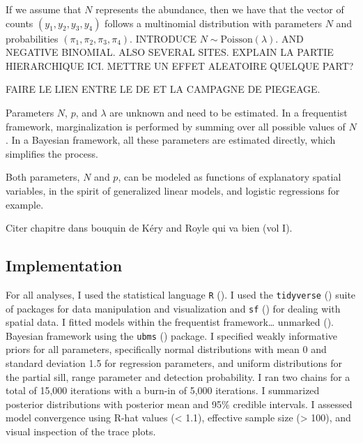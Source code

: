 \documentclass[
  11pt,
  a4paper,
]{article}
\begin{document}
If we assume that \(N\) represents the abundance, then we have that the vector of counts \((y_1, y_2, y_3, y_4)\) follows a multinomial distribution with parameters \(N\) and probabilities \((\pi_1,\pi_2,\pi_3,\pi_4)\). INTRODUCE \(N \sim \text{Poisson}(\lambda)\). AND NEGATIVE BINOMIAL. ALSO SEVERAL SITES. EXPLAIN LA PARTIE HIERARCHIQUE ICI. METTRE UN EFFET ALEATOIRE QUELQUE PART?

FAIRE LE LIEN ENTRE LE DE ET LA CAMPAGNE DE PIEGEAGE.

Parameters \(N\), \(p\), and \(\lambda\) are unknown and need to be estimated. In a frequentist framework, marginalization is performed by summing over all possible values of \(N\). In a Bayesian framework, all these parameters are estimated directly, which simplifies the process.

Both parameters, \(N\) and \(p\), can be modeled as functions of explanatory spatial variables, in the spirit of generalized linear models, and logistic regressions for example.

Citer chapitre dans bouquin de Kéry and Royle qui va bien (vol I).

\subsection{Implementation}\label{implementation}

For all analyses, I used the statistical language \texttt{R} (). I used the \texttt{tidyverse} () suite of packages for data manipulation and visualization and \texttt{sf} () for dealing with spatial data. I fitted models within the frequentist framework\ldots{} unmarked (). Bayesian framework using the \texttt{ubms} () package. I specified weakly informative priors for all parameters, specifically normal distributions with mean 0 and standard deviation 1.5 for regression parameters, and uniform distributions for the partial sill, range parameter and detection probability. I ran two chains for a total of 15,000 iterations with a burn-in of 5,000 iterations. I summarized posterior distributions with posterior mean and 95\% credible intervals. I assessed model convergence using R-hat values (\textless{} 1.1), effective sample size (\textgreater{} 100), and visual inspection of the trace plots.
\end{document}
